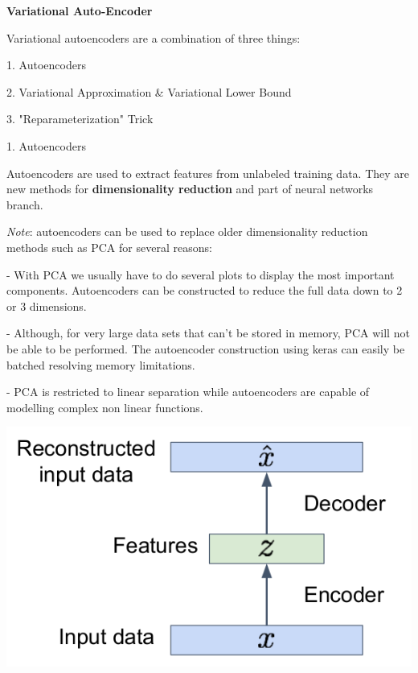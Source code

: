 {\fontsize{12pt}{22pt} \textbf{Variational Auto-Encoder}\par}

\vspace{5mm}

Variational autoencoders are a combination of three things:

1. Autoencoders

2. Variational Approximation \& Variational Lower Bound

3. "Reparameterization" Trick

\vspace{5mm}

1. Autoencoders

Autoencoders are used to extract features from unlabeled training data. They are new methods for \textbf{dimensionality reduction} and part of neural networks branch.

\vspace{5mm}

\textit{Note}: autoencoders can be used to replace older dimensionality reduction methods such as PCA for several reasons:

- With PCA we usually have to do several plots to display the most important components. Autoencoders can be constructed to reduce the full data down to 2 or 3 dimensions.

- Although, for very large data sets that can’t be stored in memory, PCA will not be able to be performed. The autoencoder construction using keras can easily be batched resolving memory limitations.

- PCA is restricted to linear separation while autoencoders are capable of modelling complex non linear functions.

\begin{center}
\includegraphics[scale=0.3]{Autoencoders.png}
\end{center}

